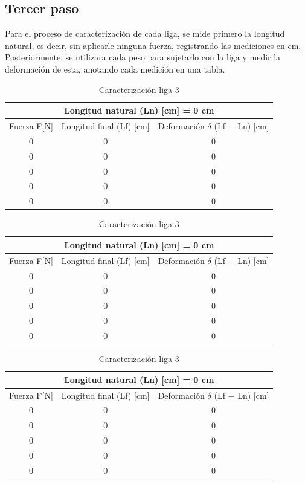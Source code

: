 \documentclass[12pt, titlepage]{report}
\begin{document}
    \subsection*{Tercer paso}
    Para el proceso de caracterización de cada liga, se mide primero la longitud natural, es decir, sin aplicarle ninguna fuerza, registrando las mediciones en cm. Posteriormente, se utilizara cada peso para sujetarlo con la liga y medir la deformación de esta, anotando cada medición en una tabla. 

    \begin{table}[ht]
        \centering
        \begin{tabular}{|c|c|c|}
            \hline
            \multicolumn{3}{|c|}{Longitud natural (Ln) [cm] = 0 cm} \\ \hline
            Fuerza F[N] & Longitud final (Lf) [cm] & Deformación $\delta$  (Lf $-$ Ln) [cm] \\ \hline
            0 & 0 & 0 \\ \hline
            0 & 0 & 0 \\ \hline
            0 & 0 & 0 \\ \hline
            0 & 0 & 0 \\ \hline
            0 & 0 & 0 \\ \hline
        \end{tabular}
        \caption{Caracterización liga 1}
        \vspace*{2cm}

        \begin{tabular}{|c|c|c|}
            \hline
            \multicolumn{3}{|c|}{Longitud natural (Ln) [cm] = 0 cm} \\ \hline
            Fuerza F[N] & Longitud final (Lf) [cm] & Deformación $\delta$  (Lf $-$ Ln) [cm] \\ \hline
            0 & 0 & 0 \\ \hline
            0 & 0 & 0 \\ \hline
            0 & 0 & 0 \\ \hline
            0 & 0 & 0 \\ \hline
            0 & 0 & 0 \\ \hline
        \end{tabular}
        \caption{Caracterización liga 2}
        \vspace*{2cm}

        \begin{tabular}{|c|c|c|}
            \hline
            \multicolumn{3}{|c|}{Longitud natural (Ln) [cm] = 0 cm} \\ \hline
            Fuerza F[N] & Longitud final (Lf) [cm] & Deformación $\delta$  (Lf $-$ Ln) [cm] \\ \hline
            0 & 0 & 0 \\ \hline
            0 & 0 & 0 \\ \hline
            0 & 0 & 0 \\ \hline
            0 & 0 & 0 \\ \hline
            0 & 0 & 0 \\ \hline
        \end{tabular}
        \caption{Caracterización liga 3}
    \end{table}
    \clearpage
\end{document}
